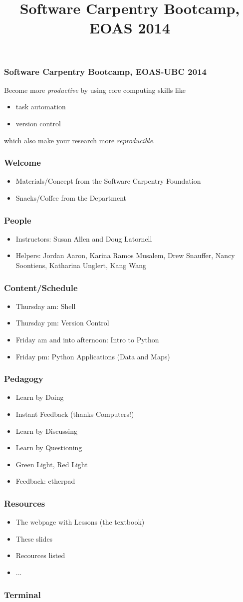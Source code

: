 \documentclass[xcolor=dvipsnames]{beamer}
\title{Software Carpentry Bootcamp, EOAS 2014}
\begin{document}
\begin{frame}
\frametitle{Software Carpentry Bootcamp, EOAS-UBC 2014}
Become more {\em productive} by using core computing skills like
\begin{itemize}
\item task automation
\item version control
\end{itemize}
which also make your research more {\em reproducible}.
\end{frame}

\begin{frame}
\frametitle{Welcome}
\begin{itemize}
\item Materials/Concept from the Software Carpentry Foundation
\item Snacks/Coffee from the Department
\end{itemize}
\end{frame}

\begin{frame}
\frametitle{People}
\begin{itemize}
\item Instructors: Susan Allen and Doug Latornell
\item Helpers: Jordan Aaron, Karina Ramos Musalem, Drew Snauffer, Nancy Soontiens, Katharina Unglert, Kang Wang
\end{itemize}
\end{frame}

\begin{frame}
\frametitle{Content/Schedule}
\begin{itemize}
\item Thursday am: Shell
\item Thursday pm: Version Control
\item Friday am and into afternoon: Intro to Python
\item Friday pm: Python Applications (Data and Maps)
\end{itemize}
\end{frame}

\begin{frame}
\frametitle{Pedagogy}
\begin{itemize}
\item Learn by Doing
\item Instant Feedback (thanks Computers!)
\item Learn by Discussing
\item Learn by Questioning
\item Green Light, Red Light
\item Feedback: etherpad
\end{itemize}
\end{frame}

\begin{frame}
\frametitle{Resources}
\begin{itemize}
\item The webpage with Lessons (the textbook)
\item These slides
\item Recources listed
\item ...
\end{itemize}
\end{frame}

\begin{frame}
\frametitle{Terminal}
\end{frame}
\end{document}
